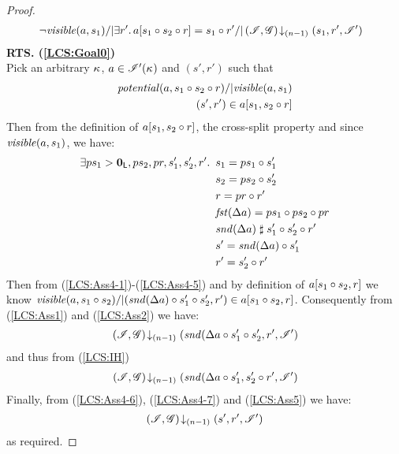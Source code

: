 \begin{lemma}
\begin{proof}
\begin{align}
%  
  &\ \neg\m{visible}(a,s_1) /| \exsts{r'} a[s_1 \composeL s_2 \composeL r] = s_1 \composeL r' /| \extendsAMUpto{\lmod, \gmod}{(n-1)}{s_1}{r'}{\lmod'}  \label{LCS:Goal3}
%
\end{align}
%
\textbf{RTS. (\ref{LCS:Goal0})}\\
Pick an arbitrary $\kappa_{}$, $a \in \mathscr{I}'(\kappa_{})$ and $(s', r')$ such that 
\begin{align}
	\mathit{potential}(a, s_1 \circ s_2 \circ r) /| \mathit{visible}(a, s_1) \label{LCS:Ass2}\\
	(s', r') \in a[s_1, s_2 \circ r] \label{LCS:Ass3}
\end{align}
%
Then from the definition of $a[s_1, s_2 \circ r]$, the cross-split property and since $\mathit{visible}(a, s_1)$, we have:
%
\begin{align}
	\exists ps_1 > \mathbf{0}_{\textsf{L}}, ps_2, pr, s'_1, s'_2, r'.\,\ & s_1 = ps_1 \circ  s'_1 \label{LCS:Ass4-1}\\
	& s_2 = ps_2 \circ s'_2 \label{LCS:Ass4-2}\\
	& r = pr \circ r' \label{LCS:Ass4-3}\\
	& \mathit{fst}(\Delta {a}) = ps_1 \circ ps_2 \circ pr \label{LCS:Ass4-4}\\
	& \mathit{snd}(\Delta {a}) \mathrel{\sharp} s'_1 \circ s'_2 \circ r'  \label{LCS:Ass4-5}\\
	& s' = \mathit{snd}(\Delta {a}) \circ s'_1 \label{LCS:Ass4-6}\\
	& r' = s'_2 \circ r' \label{LCS:Ass4-7}
\end{align}
% 
Then from (\ref{LCS:Ass4-1})-(\ref{LCS:Ass4-5}) and by definition of $a[s_1 \circ s_2, r]$ we know $\mathit{visible}(a, s_1 \circ s_2) /| (\mathit{snd}(\Delta {a}) \circ s'_1 \circ s'_2, r') \in a[s_1 \circ s_2, r]$. Consequently from (\ref{LCS:Ass1}) and (\ref{LCS:Ass2}) we have:
%
\begin{equation}
	\left(\mathscr{I}, \mathscr{G}\right) \!\downarrow_{(n-1)} \left(\mathit{snd}(\Delta {a} \circ s'_1 \circ s'_2, r', \mathscr{I}'\right) \nonumber
\end{equation}
%
and thus from (\ref{LCS:IH})
%
\begin{align}
	\left(\mathscr{I}, \mathscr{G}\right) \!\downarrow_{(n-1)} \left(\mathit{snd}(\Delta {a} \circ s'_1, s'_2 \circ r', \mathscr{I}'\right) \label{LCS:Ass5}
\end{align}
% 
Finally, from (\ref{LCS:Ass4-6}), (\ref{LCS:Ass4-7}) and (\ref{LCS:Ass5}) we have: 
%
\begin{align}
	\left(\mathscr{I}, \mathscr{G}\right) \!\downarrow_{(n-1)} \left(s', r', \mathscr{I}'\right) \nonumber
\end{align}
% 
as required.


\end{proof}
\end{lemma}
